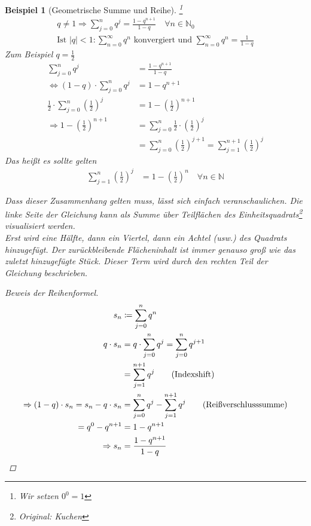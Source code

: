 \documentclass[11pt, twoside, a4paper]{article}
\theoremstyle{plain}
\newtheorem{beispiel}[blockelement]{Beispiel}
\newcommand{\pair}[1]{\left(#1\right)}
\newcommand{\abs}[1]{\left\lvert#1\right\rvert}
\newcommand{\equivalent}[0]{\Leftrightarrow{}}
\newcommand{\impl}[0]{\Rightarrow{}}
\newcommand{\definedas}[0]{\coloneqq}
\newcommand{\anf}[1]{\glqq{}#1\grqq}
\newcommand{\N}{\mathbb{N}}
\begin{document}
    \begin{beispiel}[Geometrische Summe und Reihe]
        \footnote{Wir setzen $0^0 = 1$}
        \begin{align*}
            q\neq 1 \impl \sum_{j=0}^{n} q^j = \frac{1-q^{n+1}}{1-q}\quad\forall n\in\N_0\\
            \text{Ist } \abs{q} < 1\colon \sum_{n=0}^{\infty} q^n\text{ konvergiert und } \sum_{n=0}^{\infty} q^n = \frac{1}{1-q}\tag{geometrische Reihe}
        \end{align*}
        Zum Beispiel $q=\frac{1}{2}$
        \begin{align*}
            \sum_{j=0}^{n} q^j &= \frac{1-q^{n+1}}{1-q}\\
            \equivalent \pair{1-q}\cdot \sum_{j=0}^{n} q^j &= 1-q^{n+1}\\
            \frac{1}{2}\cdot\sum_{j=0}^{n} \pair{\frac{1}{2}}^j &= 1 - \pair{\frac{1}{2}}^{n+1}\\
            \impl 1 - \pair{\frac{1}{2}}^{n+1} &= \sum_{j=0}^{n} \frac{1}{2}\cdot\pair{\frac{1}{2}}^j\\
            &= \sum_{j=0}^{n} \pair{\frac{1}{2}}^{j+1} = \sum_{j=1}^{n+1} \pair{\frac{1}{2}}^j
        \end{align*}
        Das heißt es sollte gelten
        \begin{align*}
            \sum_{j=1}^{n} \pair{\frac{1}{2}}^j &= 1-\pair{\frac{1}{2}}^n\quad \forall n\in\N
        \end{align*}

        \noindent Dass dieser Zusammenhang gelten muss, lässt sich einfach veranschaulichen. Die linke Seite der Gleichung kann als Summe über Teilflächen des Einheitsquadrats\footnote{Original: \anf{Kuchen}} visualisiert werden.\\
        Erst wird eine Hälfte, dann ein Viertel, dann ein Achtel (usw.) des Quadrats hinzugefügt. Der zurückbleibende Flächeninhalt ist immer genauso groß wie das zuletzt hinzugefügte Stück. Dieser Term wird durch den rechten Teil der Gleichung beschrieben.

        \begin{proof}[Beweis der Reihenformel]
            \begin{align*}
                s_n &\definedas \sum_{j=0}^{n} q^n\\
                q\cdot s_n &= q\cdot \sum_{j=0}^{n} q^j = \sum_{j=0}^{n} q^{j+1}\\
                &= \sum_{j=1}^{n+1} q^j\tag{Indexshift}\\
                \impl (1-q)\cdot s_n = s_n - q\cdot s_n &= \sum_{j=0}^{n}  q^j - \sum_{j=1}^{n+1} q^j\tag{Reißverschlusssumme}\\
                = q^0 - q^{n+1} &= 1 - q^{n+1}\\
                \impl s_n &= \frac{1-q^{n+1}}{1-q}\qedhere
            \end{align*}
        \end{proof}


\end{beispiel}
\end{document}
